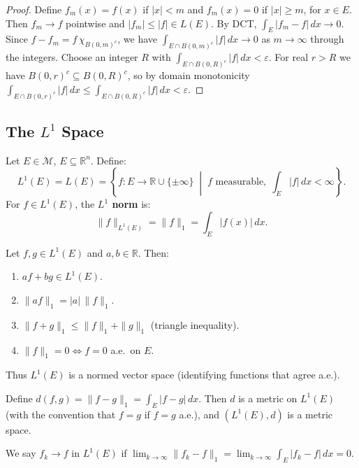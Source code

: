 \documentclass[11pt]{report}
\begin{document}
\begin{proof}
Define $f_m(x) = f(x)$ if $|x| < m$ and $f_m(x) = 0$ if $|x| \geq m$, for $x \in E$. Then $f_m \to f$ pointwise and $|f_m| \leq |f| \in L(E)$. By DCT, $\int_E |f_m - f|\,dx \to 0$. Since $f - f_m = f\,\chi_{B(0,m)^c}$, we have $\int_{E \cap B(0,m)^c} |f|\,dx \to 0$ as $m \to \infty$ through the integers. Choose an integer $R$ with $\int_{E \cap B(0,R)^c} |f|\,dx < \varepsilon$. For real $r > R$ we have $B(0,r)^c \subseteq B(0,R)^c$, so by domain monotonicity $\int_{E \cap B(0,r)^c} |f|\,dx \leq \int_{E \cap B(0,R)^c} |f|\,dx < \varepsilon$.
\end{proof}

\subsection{The $L^1$ Space}

\begin{defbox}
Let $E \in \mathcal{M}$, $E \subseteq \mathbb{R}^n$. Define:
\[
L^1(E) = L(E) = \left\{f: E \to \mathbb{R} \cup \{\pm\infty\} \;\middle|\; f \text{ measurable},\; \int_E |f|\,dx < \infty\right\}.
\]
For $f \in L^1(E)$, the \textbf{$L^1$ norm} is:
\[
\|f\|_{L^1(E)} = \|f\|_1 = \int_E |f(x)|\,dx.
\]
\end{defbox}

\begin{thmbox}
Let $f, g \in L^1(E)$ and $a, b \in \mathbb{R}$. Then:
\begin{enumerate}[label=(\roman*)]
\item $af + bg \in L^1(E)$.
\item $\|af\|_1 = |a|\,\|f\|_1$.
\item $\|f + g\|_1 \leq \|f\|_1 + \|g\|_1$ \quad (triangle inequality).
\item $\|f\|_1 = 0 \iff f = 0$ a.e.\ on $E$.
\end{enumerate}
Thus $L^1(E)$ is a normed vector space (identifying functions that agree a.e.).
\end{thmbox}

\begin{defbox}
Define $d(f, g) = \|f - g\|_1 = \int_E |f - g|\,dx$. Then $d$ is a metric on $L^1(E)$ (with the convention that $f = g$ if $f = g$ a.e.), and $(L^1(E), d)$ is a metric space.

We say $f_k \to f$ in $L^1(E)$ if $\lim_{k \to \infty} \|f_k - f\|_1 = \lim_{k \to \infty} \int_E |f_k - f|\,dx = 0$.
\end{defbox}
\end{document}

